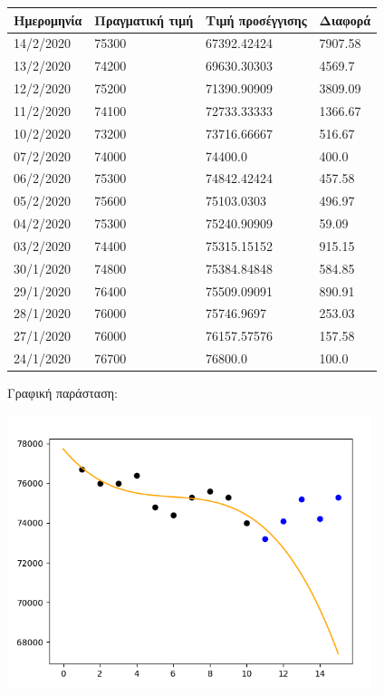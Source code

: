 \documentclass[a4paper,11pt]{article}
\begin{document}
	\begin{tabular}{| l | l | l | l |}
	\hline
	Ημερομηνία & Πραγματική τιμή & Τιμή προσέγγισης & Διαφορά
	\\ \hline
	14/2/2020 & 75300 & 67392.42424 & 7907.58
	\\ \hline
	13/2/2020 & 74200 & 69630.30303 & 4569.7
	\\ \hline
	12/2/2020 & 75200 & 71390.90909 & 3809.09
	\\ \hline
	11/2/2020 & 74100 & 72733.33333 & 1366.67
	\\ \hline
	10/2/2020 & 73200 & 73716.66667 & 516.67
	\\ \hline
	07/2/2020 & 74000 & 74400.0 & 400.0
	\\ \hline
	06/2/2020 & 75300 & 74842.42424 & 457.58
	\\ \hline
	05/2/2020 & 75600 & 75103.0303 & 496.97
	\\ \hline
	04/2/2020 & 75300 & 75240.90909 & 59.09
	\\ \hline
	03/2/2020 & 74400 & 75315.15152 & 915.15
	\\ \hline
	30/1/2020 & 74800 & 75384.84848 & 584.85
	\\ \hline
	29/1/2020 & 76400 & 75509.09091 & 890.91
	\\ \hline
	28/1/2020 & 76000 & 75746.9697 & 253.03
	\\ \hline
	27/1/2020 & 76000 & 76157.57576 & 157.58
	\\ \hline
	24/1/2020 & 76700 & 76800.0 & 100.0
	\\ \hline
	\end{tabular}

	\hfill \break
	
	Γραφική παράσταση:
	
	\includegraphics[height=8cm]{eydap-3-alt.png}
	
\end{document}
